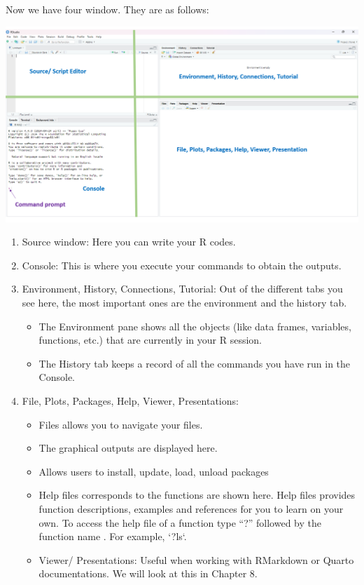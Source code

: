 \documentclass[
  letterpaper,
  DIV=11,
  numbers=noendperiod]{scrreprt}
\providecommand{\tightlist}{%
  \setlength{\itemsep}{0pt}\setlength{\parskip}{0pt}}\usepackage{longtable,booktabs,array}
\begin{document}
Now we have four window. They are as follows:

\includegraphics[width=5.33in,height=\textheight,keepaspectratio]{img/chap1/rw5.png}

\begin{enumerate}
\def\labelenumi{\arabic{enumi}.}
\tightlist
\item
  Source window: Here you can write your R codes.
\item
  Console: This is where you execute your commands to obtain the
  outputs.
\item
  Environment, History, Connections, Tutorial: Out of the different tabs
  you see here, the most important ones are the environment and the
  history tab.

  \begin{itemize}
  \item
    The Environment pane shows all the objects (like data frames,
    variables, functions, etc.) that are currently in your R session.
  \item
    The History tab keeps a record of all the commands you have run in
    the Console.
  \end{itemize}
\item
  File, Plots, Packages, Help, Viewer, Presentations:

  \begin{itemize}
  \item
    Files allows you to navigate your files.
  \item
    The graphical outputs are displayed here.
  \item
    Allows users to install, update, load, unload packages
  \item
    Help files corresponds to the functions are shown here. Help files
    provides function descriptions, examples and references for you to
    learn on your own. To access the help file of a function type ``?''
    followed by the function name . For example, `?ls`.
  \item
    Viewer/ Presentations: Useful when working with RMarkdown or Quarto
    documentations. We will look at this in Chapter 8.
  \end{itemize}
\end{enumerate}
\end{document}
